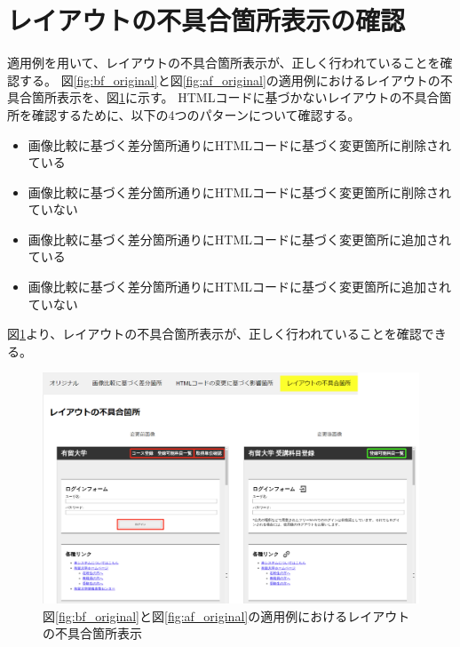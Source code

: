 \section{レイアウトの不具合箇所表示の確認}
適用例を用いて、レイアウトの不具合箇所表示が、正しく行われていることを確認する。
図\ref{fig:bf_original}と図\ref{fig:af_original}の適用例におけるレイアウトの不具合箇所表示を、図\ref{fig: 5_app3}に示す。
HTMLコードに基づかないレイアウトの不具合箇所を確認するために、以下の4つのパターンについて確認する。
\begin{itemize}
    \item 画像比較に基づく差分箇所通りにHTMLコードに基づく変更箇所に削除されている
    \item 画像比較に基づく差分箇所通りにHTMLコードに基づく変更箇所に削除されていない
    \item 画像比較に基づく差分箇所通りにHTMLコードに基づく変更箇所に追加されている
    \item 画像比較に基づく差分箇所通りにHTMLコードに基づく変更箇所に追加されていない
\end{itemize}
図\ref{fig: 5_app3}より、レイアウトの不具合箇所表示が、正しく行われていることを確認できる。
\begin{figure}[tp]
    \begin{center}
        \includegraphics[width=1.0\columnwidth]{image/5/5_app_3.png}
        \caption{図\ref{fig:bf_original}と図\ref{fig:af_original}の適用例におけるレイアウトの不具合箇所表示}
        \label{fig: 5_app3}
    \end{center}
\end{figure}




